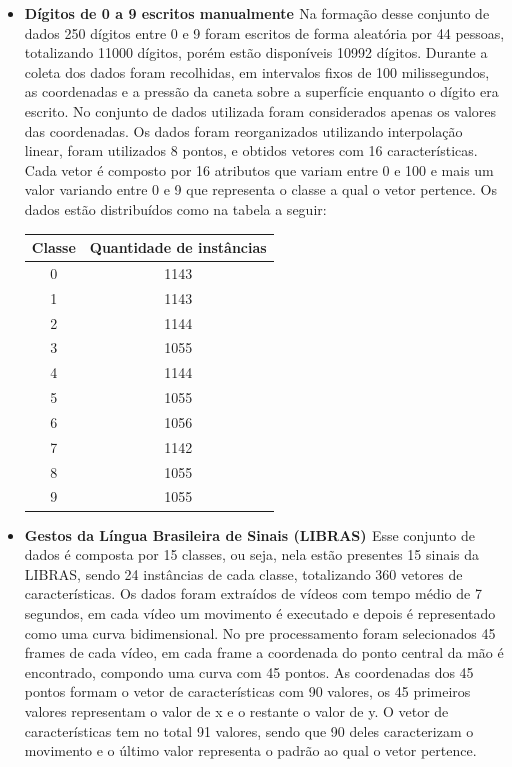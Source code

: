 \begin{itemize}
\item \textbf{Dígitos de 0 a 9 escritos manualmente \cite{Digitos}}
Na formação desse conjunto de dados 250 dígitos entre 0 e 9 foram escritos de forma aleatória por 44 pessoas, totalizando 11000 dígitos, porém estão disponíveis 10992 dígitos. Durante a coleta dos dados foram recolhidas, em intervalos fixos de 100 milissegundos, as coordenadas e a pressão da caneta sobre a superfície enquanto o dígito era escrito. No conjunto de dados utilizada foram considerados apenas os valores das coordenadas. Os dados foram reorganizados utilizando interpolação linear, foram utilizados 8 pontos, e obtidos vetores com 16 características.
Cada vetor é composto por 16 atributos que variam entre 0 e 100 e mais um valor variando entre 0 e 9 que representa o classe a qual o vetor pertence.
Os dados estão distribuídos como na tabela a seguir:
\begin{center}
	\begin{tabular}{cc}
        \hline
        Classe & Quantidade de instâncias \\
        \hline
		0 & 1143 \\
		1 & 1143 \\
		2 & 1144 \\
		3 & 1055 \\
		4 & 1144 \\
		5 & 1055 \\
		6 & 1056 \\
		7 & 1142 \\
		8 & 1055 \\
		9 & 1055 \\
        \hline
	\end{tabular}
	\label{tab:tabela_digitos}
\end{center}

\item\textbf{Gestos da Língua Brasileira de Sinais (LIBRAS) \cite{Libras}}
Esse conjunto de dados é composta por 15 classes, ou seja, nela estão presentes 15 sinais da LIBRAS, sendo 24 instâncias de cada classe, totalizando 360 vetores de características. Os dados foram extraídos de vídeos com tempo médio de 7 segundos, em cada vídeo um movimento é executado e depois é representado como uma curva bidimensional. No pre processamento foram selecionados 45 frames de cada vídeo, em cada frame a coordenada do ponto central da mão é encontrado, compondo uma curva com 45 pontos. As coordenadas dos 45 pontos formam o vetor de características com 90 valores, os 45 primeiros valores representam o valor de x e o restante o valor de y.
O vetor de características tem no total 91 valores, sendo que 90 deles caracterizam o movimento e o último valor representa o padrão ao qual o vetor pertence.


\end{itemize}
